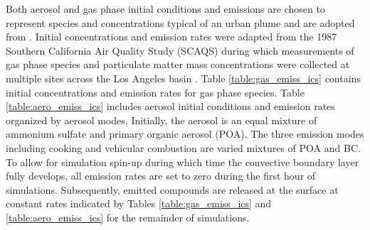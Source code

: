 \documentclass[journal abbreviation, manuscript]{copernicus}
\begin{document}
Both aerosol and gas phase initial conditions and emissions are chosen to represent species and concentrations typical of an urban plume and are adopted from \citet{riemer_simulating_2009}. Initial concentrations and emission rates were adapted from the 1987 Southern California Air Quality Study (SCAQS) during which measurements of gas phase species and particulate matter mass concentrations were collected at multiple sites across the Los Angeles basin \citep{zaveri_model_2008}. Table \ref{table:gas_emiss_ics} contains initial concentrations and emission rates for gas phase species. Table \ref{table:aero_emiss_ics} includes aerosol initial conditions and emission rates organized by aerosol modes. Initially, the aerosol is an equal mixture of ammonium sulfate and primary organic aerosol (POA). The three emission modes including cooking and vehicular combustion are varied mixtures of POA and BC. To allow for simulation spin-up during which time the convective boundary layer fully develops, all emission rates are set to zero during the first hour of simulations. Subsequently, emitted compounds are released at the surface at constant rates indicated by Tables \ref{table:gas_emiss_ics} and \ref{table:aero_emiss_ics} for the remainder of simulations.
\end{document}
